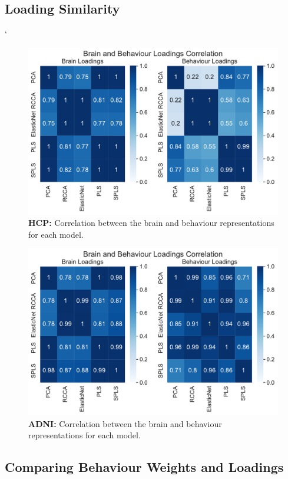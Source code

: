 \subsection{Loading Similarity}

`\begin{figure}
     \centering
     \includegraphics[width=0.8\linewidth]{figures/hcp/brain and behaviour loadings correlation}
     \caption{\textbf{HCP:} Correlation between the brain and behaviour \gls{representations} for each model.}
\end{figure}

\begin{figure}
    \centering
    \includegraphics[width=0.8\linewidth]{figures/adni/brain and behaviour loadings correlation}
    \caption{\textbf{ADNI:} Correlation between the brain and behaviour \gls{representations} for each model.}
\end{figure}

\subsection{Comparing Behaviour Weights and Loadings}

